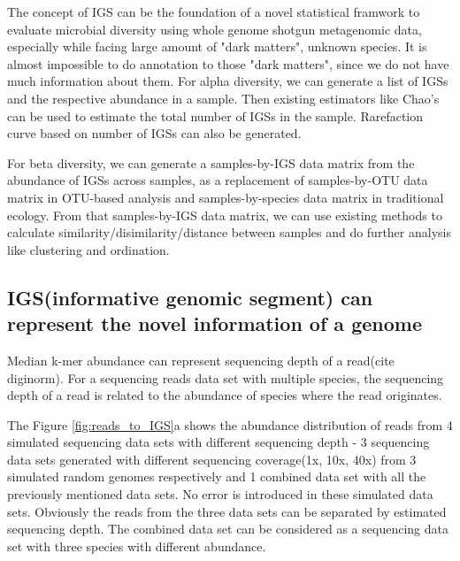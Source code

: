 \documentclass[12pt]{report}
\begin{document}
The concept of IGS can be the foundation of a novel statistical framwork to
evaluate microbial diversity using whole genome shotgun metagenomic data, 
especially while facing large amount of "dark matters", unknown species. It is
almost impossible to do annotation to those "dark matters", since we do not
have much information about them. 
For alpha diversity, we can generate a list of IGSs and the respective 
abundance in a sample. Then existing estimators like Chao's can be used to 
estimate the total number of IGSs in the sample. Rarefaction curve based on 
number of IGSs can also be generated. 

For beta diversity, we can generate a samples-by-IGS data matrix from the
abundance of IGSs across samples, as a replacement of samples-by-OTU data 
matrix in OTU-based analysis and samples-by-species data matrix in traditional 
ecology. From that samples-by-IGS data matrix, we can use existing methods to 
calculate similarity/disimilarity/distance between samples and do further 
analysis like clustering and ordination. 





\subsection{IGS(informative genomic segment) can represent the novel 
information of a genome}

Median k-mer abundance can represent sequencing depth of a read(cite diginorm).
 For a sequencing reads data set with multiple species, the sequencing depth of
 a read is related to the abundance of species where the read originates. 

The Figure \ref{fig:reads_to_IGS}a  shows the abundance distribution of reads 
from 4 simulated sequencing data sets with different sequencing depth - 3 
sequencing data sets generated with different sequencing coverage(1x, 10x, 40x)
 from 3 simulated random genomes respectively and 1 combined data set with all 
the previously mentioned data sets. No error is introduced in these simulated 
data sets. Obviously the reads from the three data sets can be separated by 
estimated sequencing depth. The combined data set can be considered as a 
sequencing data set with three species with different abundance.
\end{document}
